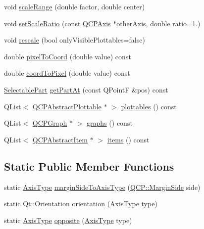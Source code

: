 \begin{DoxyCompactItemize}
\item 
void \hyperlink{classQCPAxis_a7072ff96fe690148f1bbcdb4f773ea1c}{scale\+Range} (double factor, double center)
\item 
void \hyperlink{classQCPAxis_af4bbd446dcaee5a83ac30ce9bcd6e125}{set\+Scale\+Ratio} (const \hyperlink{classQCPAxis}{Q\+C\+P\+Axis} $\ast$other\+Axis, double ratio=1.)
\item 
void \hyperlink{classQCPAxis_a499345f02ebce4b23d8ccec96e58daa9}{rescale} (bool only\+Visible\+Plottables=false)
\item 
double \hyperlink{classQCPAxis_ae9289ef7043b9d966af88eaa95b037d1}{pixel\+To\+Coord} (double value) const 
\item 
double \hyperlink{classQCPAxis_a985ae693b842fb0422b4390fe36d299a}{coord\+To\+Pixel} (double value) const 
\item 
\hyperlink{classQCPAxis_abee4c7a54c468b1385dfce2c898b115f}{Selectable\+Part} \hyperlink{classQCPAxis_ab2965a8ab1da948b897f1c006080760b}{get\+Part\+At} (const Q\+PointF \&pos) const 
\item 
Q\+List$<$ \hyperlink{classQCPAbstractPlottable}{Q\+C\+P\+Abstract\+Plottable} $\ast$ $>$ \hyperlink{classQCPAxis_a4f7404494cccdbfc00e1e865b7ed16a4}{plottables} () const 
\item 
Q\+List$<$ \hyperlink{classQCPGraph}{Q\+C\+P\+Graph} $\ast$ $>$ \hyperlink{classQCPAxis_ad3919e7d7400f55446ea82018fe5e3a8}{graphs} () const 
\item 
Q\+List$<$ \hyperlink{classQCPAbstractItem}{Q\+C\+P\+Abstract\+Item} $\ast$ $>$ \hyperlink{classQCPAxis_ae437656a5fd1a03721a8f2d7aab460fe}{items} () const 
\end{DoxyCompactItemize}
\subsection*{Static Public Member Functions}
\begin{DoxyCompactItemize}
\item 
static \hyperlink{classQCPAxis_ae2bcc1728b382f10f064612b368bc18a}{Axis\+Type} \hyperlink{classQCPAxis_ac0a6b77bd52bec6c81cd62d167cfeba6}{margin\+Side\+To\+Axis\+Type} (\hyperlink{namespaceQCP_a7e487e3e2ccb62ab7771065bab7cae54}{Q\+C\+P\+::\+Margin\+Side} side)
\item 
static Qt\+::\+Orientation \hyperlink{classQCPAxis_a9a68b3e45f1b1e33d4d807822342516c}{orientation} (\hyperlink{classQCPAxis_ae2bcc1728b382f10f064612b368bc18a}{Axis\+Type} type)
\item 
static \hyperlink{classQCPAxis_ae2bcc1728b382f10f064612b368bc18a}{Axis\+Type} \hyperlink{classQCPAxis_aa85ba73dfee6483e23825461b725e363}{opposite} (\hyperlink{classQCPAxis_ae2bcc1728b382f10f064612b368bc18a}{Axis\+Type} type)
\end{DoxyCompactItemize}
